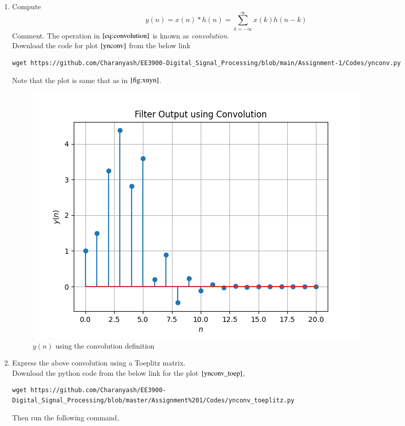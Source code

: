 \documentclass[journal,12pt,twocolumn]{IEEEtran}
\renewcommand\thesection{\arabic{section}}
\begin{document}
\begin{enumerate}[label=\thesection.\arabic*]
        \item Compute 
     \begin{equation}
     \label{eq:convolution}
     y(n) = x(n)*h(n) = \sum_{k=-\infty}^{\infty}x(k)h(n-k)
     \end{equation}
     Comment. The operation in $\eqref{eq:convolution}$ is known as
     {\em convolution}.\\
     \solution Download the code for plot $\ref{ynconv}$ from the below link
      \begin{lstlisting}
wget https://github.com/Charanyash/EE3900-Digital_Signal_Processing/blob/main/Assignment-1/Codes/ynconv.py
      \end{lstlisting}
      Note that the plot is same that as in $\ref{fig:xnyn}$.
      \begin{figure}[ht!]
        \centering
        \includegraphics[width = \columnwidth]{Figs/ynconv.png}
        \caption{$y(n)$ using the convolution definition}
        \label{ynconv}
      \end{figure}
    \item Express the above convolution using a Toeplitz matrix.\\
    \solution Download the python code from the below link for the plot $\ref{ynconv_toep}$,
     \begin{lstlisting}
wget https://github.com/Charanyash/EE3900-Digital_Signal_Processing/blob/master/Assignment%201/Codes/ynconv_toeplitz.py
     \end{lstlisting}
    Then run the following command,
     \begin{lstlisting}

\end{lstlisting}
\end{enumerate}
\end{document}
